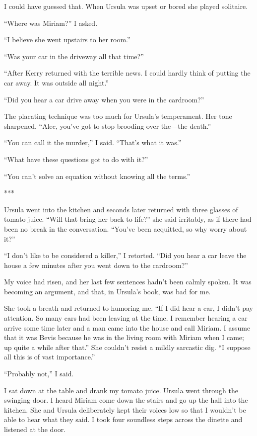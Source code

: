{I could have guessed that. When Ursula was upset or bored she played solitaire.

“Where was Miriam?” I asked.

“I believe she went upstairs to her room.”

“Was your car in the driveway all that time?”

“After Kerry returned with the terrible news. I could hardly think of putting the car away. It was outside all night.”

“Did you hear a car drive away when you were in the cardroom?”

The placating technique was too much for Ursula’s temperament. Her tone sharpened. “Alec, you’ve got to stop brooding over the—the death.”

“You can call it the murder,” I said. “That’s what it was.”

“What have these questions got to do with it?”

“You can’t solve an equation without knowing all the terms.”

***

Ursula went into the kitchen and seconds later returned with three glasses of tomato juice. “Will that bring her back to life?” she said irritably, as if there had been no break in the conversation. “You’ve been acquitted, so why worry about it?”

“I don’t like to be considered a killer,” I retorted. “Did you hear a car leave the house a few minutes after you went down to the cardroom?”

My voice had risen, and her last few sentences hadn’t been calmly spoken. It was becoming an argument, and that, in Ursula’s book, was bad for me.

She took a breath and returned to humoring me. “If I did hear a car, I didn’t pay attention. So many cars had been leaving at the time. I remember hearing a car arrive some time later and a man came into the house and call Miriam. I assume that it was Bevis because he was in the living room with Miriam when I came; up quite a while after that.” She couldn’t resist a mildly sarcastic dig. “I suppose all this is of vast importance.”

“Probably not,” I said.

I sat down at the table and drank my tomato juice. Ursula went through the swinging door. I heard Miriam come down the stairs and go up the hall into the kitchen. She and Ursula deliberately kept their voices low so that I wouldn’t be able to hear what they said. I took four soundless steps across the dinette and listened at the door.

}
